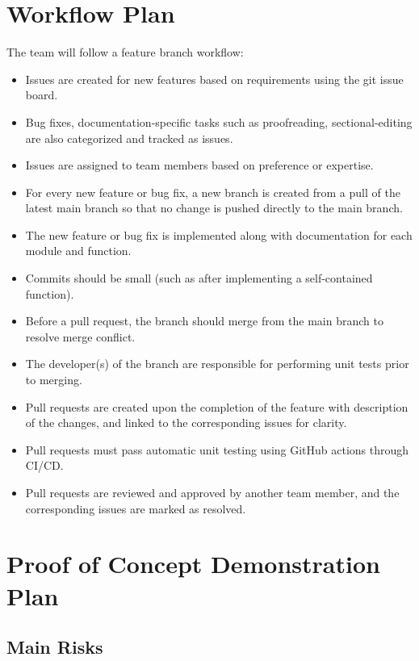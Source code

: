 \documentclass{article}
\begin{document}
\section{Workflow Plan}
The team will follow a feature branch workflow:

\begin{itemize}
	\item Issues are created for new features based on requirements using the
	      git issue board.
	\item Bug fixes, documentation-specific tasks such as proofreading,
	      sectional-editing are also categorized and tracked as issues.
	\item Issues are assigned to team members based on preference or expertise.
	\item For every new feature or bug fix, a new branch is created from a pull
	      of the latest main branch so that no change is pushed directly to the main
	      branch.
	\item The new feature or bug fix is implemented along with documentation
	      for each module and function.
	\item Commits should be small (such as after implementing a self-contained
	      function).
	\item Before a pull request, the branch should merge from the main branch
	      to resolve merge conflict.
	\item The developer(s) of the branch are responsible for performing unit
	      tests prior to merging.
	\item Pull requests are created upon the completion of the feature with
	      description of the changes, and linked to the corresponding issues for
	      clarity.
	\item Pull requests must pass automatic unit testing using GitHub actions
	      through CI/CD.
	\item Pull requests are reviewed and approved by another team member, and
	      the corresponding issues are marked as resolved.
\end{itemize}

\section{Proof of Concept Demonstration Plan}

\subsection{Main Risks}
\end{document}
